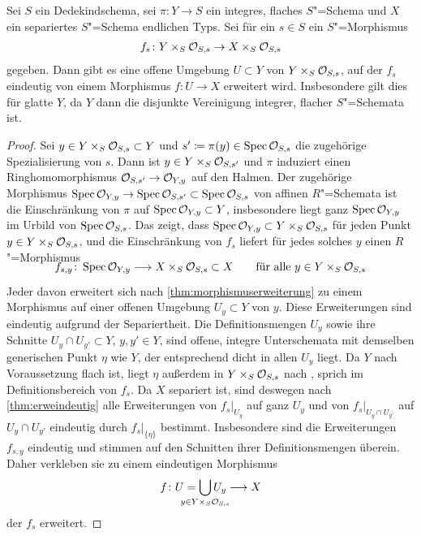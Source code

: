 \begin{Korollar}\label{thm:allgmorphismuserweiterung}
  Sei $S$ ein Dedekindschema,
  sei $\pi\colon Y\to S$ ein integres, flaches $S$"=Schema
  und $X$ ein separiertes $S$"=Schema endlichen Typs.
  Sei für ein $s\in S$ ein $S$"=Morphismus
  \begin{gather*}
    f_s\colon Y\times_S\mathcal{O}_{S,s}\to X\times_S\mathcal{O}_{S,s}
  \end{gather*}
  gegeben.
  Dann gibt es eine offene Umgebung $U\subset Y$ von
  ${Y\times_S\mathcal{O}_{S,s}}$, auf der $f_s$ eindeutig von einem Morphismus
  ${f\colon U\to X}$ erweitert wird.
  Insbesondere gilt dies für glatte $Y$, da $Y$ dann die disjunkte
  Vereinigung integrer, flacher $S$"=Schemata ist.
  \begin{proof}
    Sei $y\in Y\times_S\mathcal{O}_{S,s}\subset Y$ und
    $s'\coloneqq\pi(y)\in\operatorname{Spec}\mathcal{O}_{S,s}$ die zugehörige Spezialisierung
    von $s$. Dann ist $y\in Y\times_S\mathcal{O}_{S,s'}$ und $\pi$ induziert einen
    Ringhomomorphismus ${\mathcal{O}_{S,s'}\to\mathcal{O}_{Y,y}}$ auf den Halmen. Der
    zugehörige Morphismus
    ${\operatorname{Spec}\mathcal{O}_{Y,y}\to\operatorname{Spec}\mathcal{O}_{S,s'}\subset\operatorname{Spec}\mathcal{O}_{S,s}}$
    von affi\-nen $R$"=Schemata ist die Einschränkung von $\pi$ auf
    ${\operatorname{Spec}\mathcal{O}_{Y,y}\subset Y}$, insbesondere  liegt ganz $\operatorname{Spec}\mathcal{O}_{Y,y}$
    im Urbild von $\operatorname{Spec}\mathcal{O}_{S,s}$.
    Das zeigt, dass ${\operatorname{Spec}\mathcal{O}_{Y,y}\subset Y\times_S\mathcal{O}_{S,s}}$ für jeden
    Punkt ${y\in Y\times_S\mathcal{O}_{S,s}}$, und die Einschränkung von $f_s$
    liefert für jedes solches $y$ einen $R$"=Morphismus
    \begin{gather*}
      \SwapAboveDisplaySkip
      f_{s,y}\colon \Spec\O_{Y,y}\longto X\times_S\O_{S,s}\subset X
      \qquad \text{für alle } y \in Y\times_S\O_{S,s}
    \end{gather*}
    Jeder davon erweitert sich nach \ref{thm:morphismuserweiterung}
    zu einem Morphismus auf einer offenen Umgebung ${U_y\subset Y}$ von
    $y$.
    Diese Erweiterungen sind eindeutig aufgrund der Separiertheit.
    Die Definitionsmengen $U_y$ sowie ihre Schnitte ${U_y\cap
    U_{y'}\subset Y}$, ${y,y'\in Y}$, sind offene, integre
    Unterschemata mit demselben generischen Punkt $\eta$ wie $Y$, der
    entsprechend dicht in allen $U_y$ liegt.
    Da $Y$ nach Voraussetzung flach ist, liegt $\eta$ außerdem in
    ${Y\times_S\mathcal{O}_{S,s}}$ nach \cite[Proposition~14.14]{wedhorn}, sprich
    im Definitionsbereich von $f_s$. Da $X$ separiert ist, sind
    deswegen nach \ref{thm:erweindeutig} alle Erweiterungen von
    $f_s|_{U_y}$ auf ganz $U_y$ und von $f_s|_{U_y\cap U_{y'}}$ auf
    ${U_y\cap U_{y'}}$ eindeutig durch $f_s|_{\{\eta\}}$ bestimmt.
    Insbesondere sind die Erweiterungen $f_{s,y}$ eindeutig und
    stimmen auf den Schnitten ihrer Definitionsmengen überein.
    Daher verkleben sie zu einem eindeutigen Morphismus
    \begin{gather*}
      f\colon U=\bigcup_{\mathclap{y\in Y\times_S\O_{S,s}}} U_y\longto X
    \end{gather*}
    der $f_s$ erweitert.
  \end{proof}
\end{Korollar}
